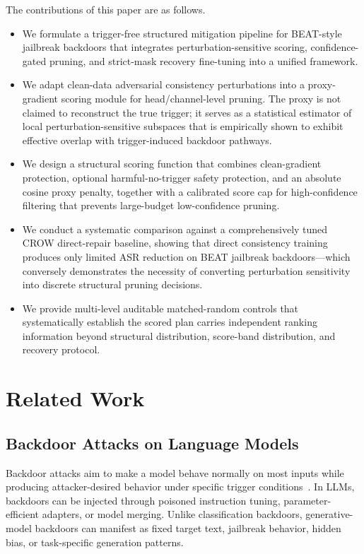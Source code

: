 \documentclass[lettersize,journal]{IEEEtran}
\begin{document}
The contributions of this paper are as follows.
\begin{itemize}
    \item We formulate a trigger-free structured mitigation pipeline for BEAT-style jailbreak backdoors that integrates perturbation-sensitive scoring, confidence-gated pruning, and strict-mask recovery fine-tuning into a unified framework.
    \item We adapt clean-data adversarial consistency perturbations into a proxy-gradient scoring module for head/channel-level pruning. The proxy is not claimed to reconstruct the true trigger; it serves as a statistical estimator of local perturbation-sensitive subspaces that is empirically shown to exhibit effective overlap with trigger-induced backdoor pathways.
    \item We design a structural scoring function that combines clean-gradient protection, optional harmful-no-trigger safety protection, and an absolute cosine proxy penalty, together with a calibrated score cap for high-confidence filtering that prevents large-budget low-confidence pruning.
    \item We conduct a systematic comparison against a comprehensively tuned CROW direct-repair baseline, showing that direct consistency training produces only limited ASR reduction on BEAT jailbreak backdoors---which conversely demonstrates the necessity of converting perturbation sensitivity into discrete structural pruning decisions.
    \item We provide multi-level auditable matched-random controls that systematically establish the scored plan carries independent ranking information beyond structural distribution, score-band distribution, and recovery protocol.
\end{itemize}

\section{Related Work}

\subsection{Backdoor Attacks on Language Models}
Backdoor attacks aim to make a model behave normally on most inputs while producing attacker-desired behavior under specific trigger conditions~\cite{badnets,trojaning,hidden_trigger,beat}. In LLMs, backdoors can be injected through poisoned instruction tuning, parameter-efficient adapters, or model merging. Unlike classification backdoors, generative-model backdoors can manifest as fixed target text, jailbreak behavior, hidden bias, or task-specific generation patterns.
\end{document}
